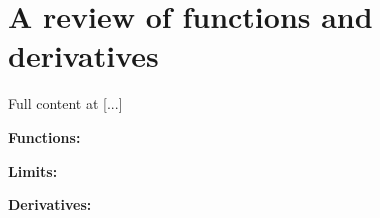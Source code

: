 \chapter{A review of functions and derivatives}
\label{appendix2}

Full content at [...]

\medskip

\textbf{Functions:}

\medskip

\textbf{Limits:}

\medskip

\textbf{Derivatives:}
